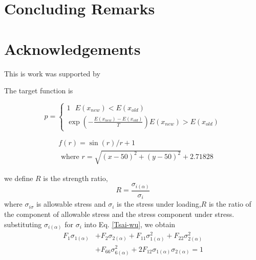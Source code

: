 \documentclass[smallextended]{svjour3}       %
\begin{document}
\section{Concluding Remarks}
\section{Acknowledgements}
This is work was supported by 






The target function is 


\begin{equation}
p=\left\{
    \begin{array}{c}{1}  
        \text{      }   E\left(x_{n e w}\right)<E\left(x_{o l d}\right)
        \\ 
{\exp \left(-\frac{E\left(x_{new}\right)-E\left(x_{old}\right)}{T}\right)}
                        E\left(x_{n e w}\right)>E\left(x_{o l d}\right)
\end{array}\right.
\end{equation}


\begin{equation*}
    \begin{split}
        &f(r)=\sin(r)/r + 1  \\
             &\text{ where  } r=\sqrt{(x-50)^2+(y-50)^2}+2.71828
    \end{split}
\end{equation*}




we define $R$ is the strength ratio,
\begin{equation}\label{strength-ratio}
    R=\frac{\sigma_{i(\alpha)}}{\sigma_i}
\end{equation}
where $\sigma_{i{\sigma}}$ is allowable stress and $\sigma_i$ is the stress under loading,$R$ is
the ratio of the component of allowable stress and the stress component under stress.
substituting $\sigma_{i(\alpha)}$ for $\sigma_i$ into Eq. \ref{Tsai-wu}, we obtain
\begin{equation}
	\begin{split}
		F_1\sigma_{1(\alpha)}&+F_2\sigma_{2(\alpha)}+F_{11}\sigma_{1(\alpha)}^2+F_{22}\sigma_{2(\alpha)}^2 \\
						&+F_{66}\sigma_{6(\alpha)}^2+2F_{12}\sigma_{1(\alpha)}\sigma_{2(\alpha)}=1
    \end{split}
\end{equation}
\end{document}
